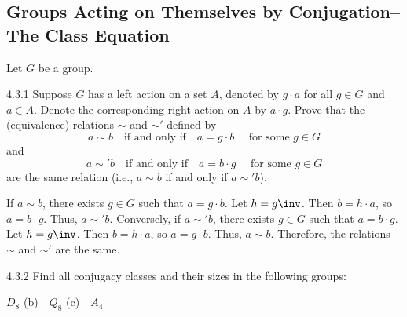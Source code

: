 \subsection{Groups Acting on Themselves by Conjugation--The Class Equation}

Let $G$ be a group.

\begin{spex}{4.3.1}
	Suppose $G$ has a left action on a set $A$, denoted by $g \cdot a$ for all $g \in G$ and $a \in A$.
	Denote the corresponding right action on $A$ by $a \cdot g$.
	Prove that the (equivalence) relations $\sim$ and $\sim'$ defined by
	\[
		 a \sim b \quad \text{if and only if} \quad a = g \cdot b \quad \text{ for some } g \in G 
	\]
	and
	\[
		 a \sim' b \quad \text{if and only if} \quad a = b \cdot g \quad \text{ for some } g \in G 
	\]
	are the same relation (i.e., $a \sim b$ if and only if $a \sim' b$).
\end{spex}

\begin{sol}[spsol]
	If $a \sim b$, there exists $g \in G$ such that $a = g \cdot b$.
	Let $h = g\inv$.
	Then $b = h \cdot a$, so $a = b \cdot g$.
	Thus, $a \sim' b$.
	Conversely, if $a \sim' b$, there exists $g \in G$ such that $a = b \cdot g$.
	Let $h = g\inv$.
	Then $b = h \cdot a$, so $a = g \cdot b$.
	Thus, $a \sim b$.
	Therefore, the relations $\sim$ and $\sim'$ are the same.
\end{sol}

\begin{exercise}{4.3.2}
	 Find all conjugacy classes and their sizes in the following groups:
	\begin{subexercises}
		\item $D_8$ \quad (b)~~$Q_8$ \quad (c)~~$A_4$
	\end{subexercises}
\end{exercise}

